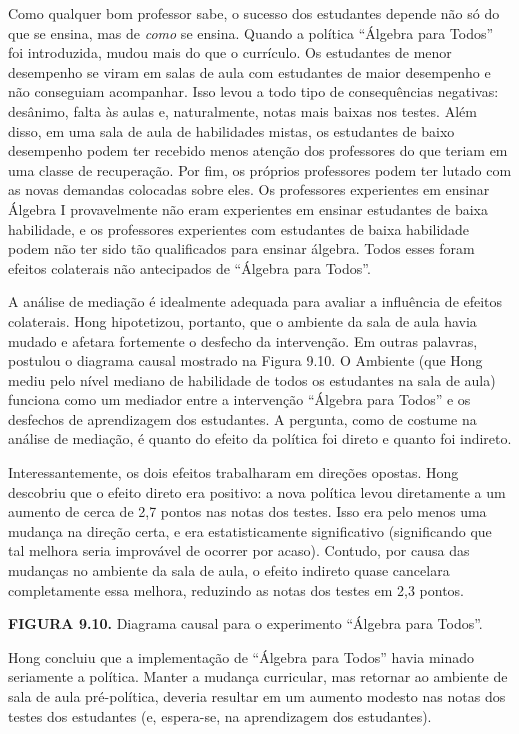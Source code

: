 \documentclass[11pt,a5paper,twoside]{book}
\begin{document}
Como qualquer bom professor sabe, o sucesso dos estudantes depende não só do que se ensina, mas de \textit{como} se ensina. Quando a política “Álgebra para Todos” foi introduzida, mudou mais do que o currículo. Os estudantes de menor desempenho se viram em salas de aula com estudantes de maior desempenho e não conseguiam acompanhar. Isso levou a todo tipo de consequências negativas: desânimo, falta às aulas e, naturalmente, notas mais baixas nos testes. Além disso, em uma sala de aula de habilidades mistas, os estudantes de baixo desempenho podem ter recebido menos atenção dos professores do que teriam em uma classe de recuperação. Por fim, os próprios professores podem ter lutado com as novas demandas colocadas sobre eles. Os professores experientes em ensinar Álgebra I provavelmente não eram experientes em ensinar estudantes de baixa habilidade, e os professores experientes com estudantes de baixa habilidade podem não ter sido tão qualificados para ensinar álgebra. Todos esses foram efeitos colaterais não antecipados de “Álgebra para Todos”.

A análise de mediação é idealmente adequada para avaliar a influência de efeitos colaterais. Hong hipotetizou, portanto, que o ambiente da sala de aula havia mudado e afetara fortemente o desfecho da intervenção. Em outras palavras, postulou o diagrama causal mostrado na Figura 9.10. O Ambiente (que Hong mediu pelo nível mediano de habilidade de todos os estudantes na sala de aula) funciona como um mediador entre a intervenção “Álgebra para Todos” e os desfechos de aprendizagem dos estudantes. A pergunta, como de costume na análise de mediação, é quanto do efeito da política foi direto e quanto foi indireto.

Interessantemente, os dois efeitos trabalharam em direções opostas. Hong descobriu que o efeito direto era positivo: a nova política levou diretamente a um aumento de cerca de 2,7 pontos nas notas dos testes. Isso era pelo menos uma mudança na direção certa, e era estatisticamente significativo (significando que tal melhora seria improvável de ocorrer por acaso). Contudo, por causa das mudanças no ambiente da sala de aula, o efeito indireto quase cancelara completamente essa melhora, reduzindo as notas dos testes em 2,3 pontos.

\textbf{FIGURA 9.10.} Diagrama causal para o experimento “Álgebra para Todos”.

Hong concluiu que a implementação de “Álgebra para Todos” havia minado seriamente a política. Manter a mudança curricular, mas retornar ao ambiente de sala de aula pré-política, deveria resultar em um aumento modesto nas notas dos testes dos estudantes (e, espera-se, na aprendizagem dos estudantes).
\end{document}
